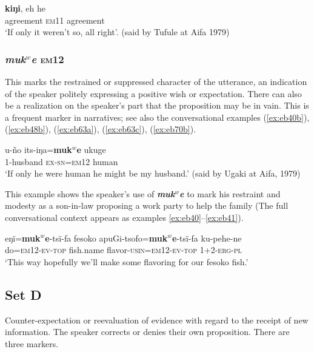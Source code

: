 \documentclass[output=paper]{langsci/langscibook}
\begin{document}
\begin{exe}
	\ex \label{ex:eb30}
	 \textbf{kiŋi}, {eh he}\\
	agreement \textsc{em11} agreement\\
	\trans ‘If only it weren’t so, all right’. (said by Tufule at Aifa 1979)
\end{exe}

\subsubsection{\textit{muk$^w$e} \textsc{em}12} 
This marks the restrained or suppressed character of the utterance, an indication of the  speaker politely expressing a positive wish or expectation.  There can also be a realization on the speaker’s part that the proposition may be in vain.  This is a frequent marker in narratives; see also the conversational examples (\ref{ex:eb40b}), (\ref{ex:eb48b}), (\ref{ex:eb63a}), (\ref{ex:eb63c}), (\ref{ex:eb70b}).

\begin{exe}
	\ex \label{ex:eb31}
	\gll u-ño its-iŋa=\textbf{muk$^w$e} ukuge\\
	1-husband \textsc{ex-sn=em12} human\\
	\trans ‘If only he were human he might  be my husband.’ (said by Ugaki at Aifa, 1979)
\end{exe}

This example shows the speaker’s  use of \textbf{\textit{muk$^w$e}} to mark his restraint and modesty as a son-in-law proposing a work party to help the family (The full conversational context appears as examples \ref{ex:eb40}--\ref{ex:eb41}).

\begin{exe}
	\ex \label{ex:eb32}
	\gll eŋï=\textbf{muk$^w$e}-tsï-fa fesoko apuGi-tsofo=\textbf{muk$^w$e}-tsï-fa ku-pehe-ne\\
	do=\textsc{em12-ev-top} fish.name flavor-\textsc{usin=em12-ev-top} 1+2-\textsc{erg-pl}\\
	\trans `This way hopefully we’ll make some flavoring for our fesoko fish.'
\end{exe}

\subsection{Set D}

Counter-expectation or reevaluation of evidence with regard to the receipt of new information.  The speaker corrects or denies their own proposition.  There are three markers.
\end{document}
